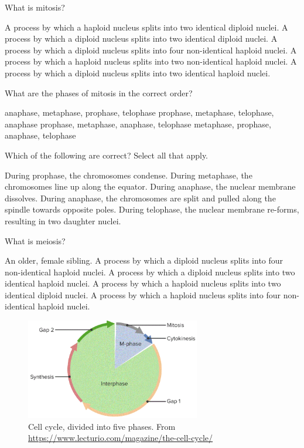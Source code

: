 \documentclass[exam,addpoints,noanswers]{exam}
\begin{document}
\begin{questions}
\question[1] What is mitosis? 
\begin{choices}
\choice A process by which a haploid nucleus splits into two identical diploid nuclei. 
\CorrectChoice A process by which a diploid nucleus splits into two identical diploid nuclei. 
\choice A process by which a diploid nucleus splits into four non-identical haploid nuclei.
\choice A process by which a haploid nucleus splits into two non-identical haploid nuclei. 
\choice A process by which a diploid nucleus splits into two identical haploid nuclei. 
\end{choices}

\question[1] What are the phases of mitosis in the correct order?
\begin{choices}
\choice anaphase, metaphase, prophase, telophase
\choice prophase, metaphase, telophase, anaphase
\CorrectChoice prophase, metaphase, anaphase, telophase
\choice metaphase, prophase, anaphase, telophase
\end{choices}

\question[1] Which of the following are correct? Select all that apply.
\begin{choices}
\CorrectChoice During prophase, the chromosomes condense. 
\CorrectChoice During metaphase, the chromosomes line up along the equator.
\CorrectChoice During anaphase, the nuclear membrane dissolves.
\CorrectChoice During anaphase, the chromosomes are split and pulled along the spindle towards opposite poles.
\CorrectChoice During telophase, the nuclear membrane re-forms, resulting in two daughter nuclei.
\end{choices}

\question[1] What is meiosis? 
\begin{choices}
\choice An older, female sibling. 
\CorrectChoice A process by which a diploid nucleus splits into four non-identical haploid nuclei.
\choice A process by which a diploid nucleus splits into two identical haploid nuclei. 
\CorrectChoice A process by which a haploid nucleus splits into two identical diploid nuclei.
\CorrectChoice A process by which a haploid nucleus splits into four non-identical haploid nuclei.
\end{choices}

\clearpage
\begin{figure}[th]
\begin{center}
\includegraphics[width=3in]{cellcycle.png}
\end{center}
\caption{Cell cycle, divided into five phases. From \url{https://www.lecturio.com/magazine/the-cell-cycle/}}
\label{fig:cellcycle}
\end{figure}


\end{questions}
\end{document}
